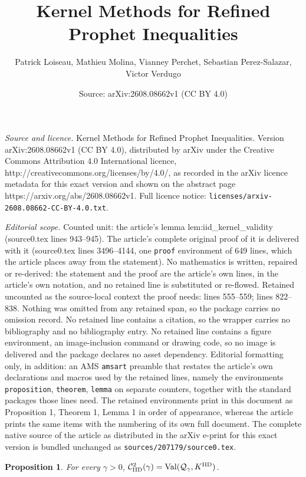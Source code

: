 \documentclass[10pt,a4paper]{amsart}
\title{Kernel Methods for Refined Prophet Inequalities}
\author{Patrick Loiseau, Mathieu Molina, Vianney Perchet, Sebastian Perez-Salazar, Victor Verdugo}
\date{Source: arXiv:2608.08662v1 (CC BY 4.0)}
\newtheorem{proposition}{Proposition}
\newcommand{\CIID}{\mathcal{C}^{2}_{\mathrm{IID}}(\comp)}
\newcommand{\IID}{\mathrm{IID}}
\newcommand{\Qgam}{\mathcal{Q}_{\comp}}
\newcommand{\Val}{\normalfont\text{Val}}
\newcommand{\comp}{\gamma}
\begin{document}
\maketitle

\noindent\emph{Source and licence.} Kernel Methods for Refined Prophet Inequalities. Version arXiv:2608.08662v1 (CC BY 4.0), distributed by arXiv under the Creative Commons Attribution 4.0 International licence, http://creativecommons.org/licenses/by/4.0/, as recorded in the arXiv licence metadata for this exact version and shown on the abstract page https://arxiv.org/abs/2608.08662v1. Full licence notice: \texttt{licenses/arxiv-2608.08662-CC-BY-4.0.txt}.\par\smallskip

\noindent\textit{Editorial scope.} Counted unit: the article's lemma lem:iid\_kernel\_validity (source0.tex lines 943--945). The article's complete original proof of it is delivered with it (source0.tex lines 3496--4144, one \texttt{proof} environment of 649 lines, which the article places away from the statement). No mathematics is written, repaired or re-derived: the statement and the proof are the article's own lines, in the article's own notation, and no retained line is substituted or re-flowed.  Retained uncounted as the source-local context the proof needs: lines 555--559; lines 822--838.  Nothing was omitted from any retained span, so the package carries no omission record.  No retained line contains a citation, so the wrapper carries no bibliography and no bibliography entry.  No retained line contains a figure environment, an image-inclusion command or drawing code, so no image is delivered and the package declares no asset dependency.  Editorial formatting only, in addition: an AMS \texttt{amsart} preamble that restates the article's own declarations and macros used by the retained lines, namely the environments \texttt{proposition}, \texttt{theorem}, \texttt{lemma} on separate counters, together with the standard packages those lines need.  The retained environments print in this document as Proposition 1, Theorem 1, Lemma 1 in order of appearance, whereas the article prints the same items with the numbering of its own full document.  The complete native source of the article as distributed in the arXiv e-print for this exact version is bundled unchanged as \texttt{sources/207179/source0.tex}.
\begin{proposition}\label{prop:iid_limit_kernel_game}
For every $\comp>0$, $\CIID
    =
    \Val(\Qgam,K^{\IID})$.
\end{proposition}
\end{document}
